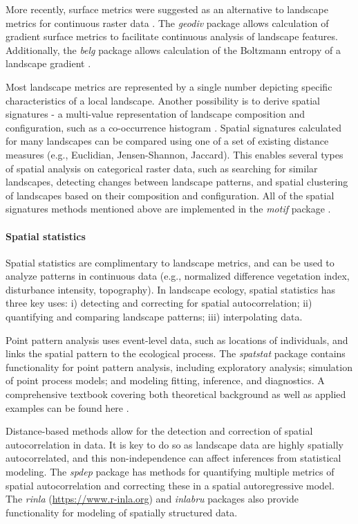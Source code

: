 \documentclass[smallextended]{svjour3}       %
\begin{document}
More recently, surface metrics were suggested as an alternative to landscape metrics for continuous raster data \cite{McGarigal2009}.
The \textit{geodiv} package \cite{Smith2020} allows calculation of gradient surface metrics to facilitate continuous analysis of landscape features.
Additionally, the \textit{belg} package allows calculation of the Boltzmann entropy of a landscape gradient \cite{Nowosad2020}.

Most landscape metrics are represented by a single number depicting specific characteristics of a local landscape.
Another possibility is to derive spatial signatures - a multi-value representation of landscape composition and configuration, such as a co-occurrence histogram \cite{Nowosad2021}.
Spatial signatures calculated for many landscapes can be compared using one of a set of existing distance measures (e.g., Euclidian, Jensen-Shannon, Jaccard).
This enables several types of spatial analysis on categorical raster data, such as searching for similar landscapes, detecting changes between landscape patterns, and spatial clustering of landscapes based on their composition and configuration.
All of the spatial signatures methods mentioned above are implemented in the \textit{motif} package \cite{Nowosad2021}.

\hypertarget{spatial-statistics}{%
\paragraph{Spatial statistics}\label{spatial-statistics}}

Spatial statistics are complimentary to landscape metrics, and can be used to analyze patterns in continuous data (e.g., normalized difference vegetation index, disturbance intensity, topography).
In landscape ecology, spatial statistics has three key uses: i) detecting and correcting for spatial autocorrelation; ii) quantifying and comparing landscape patterns; iii) interpolating data.

Point pattern analysis uses event-level data, such as locations of individuals, and links the spatial pattern to the ecological process.
The \textit{spatstat} package \cite{Baddeley2005} contains functionality for point pattern analysis, including exploratory analysis; simulation of point process models; and modeling fitting, inference, and diagnostics.
A comprehensive textbook covering both theoretical background as well as applied examples can be found here \cite{Baddeley2015}.

Distance-based methods allow for the detection and correction of spatial autocorrelation in data.
It is key to do so as landscape data are highly spatially autocorrelated, and this non-independence can affect inferences from statistical modeling.
The \textit{spdep} package \cite{Bivand2013} has methods for quantifying multiple metrics of spatial autocorrelation and correcting these in a spatial autoregressive model.
The \textit{rinla} \cite{Rue2009} (\url{https://www.r-inla.org}) and \textit{inlabru} \cite{Bachl2019} packages also provide functionality for modeling of spatially structured data.
\end{document}
